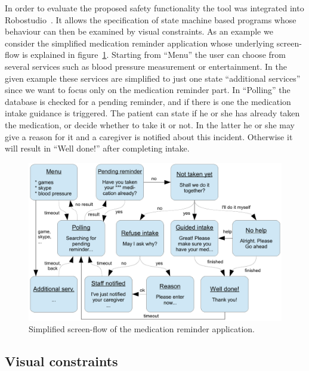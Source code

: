 \documentclass[conference]{IEEEtran}
\begin{document}
In order to evaluate the proposed safety functionality the tool was integrated into Robostudio~\cite{robostudio}. It allows the specification of state machine based programs whose behaviour can then be examined by visual constraints. As an example we consider the simplified medication reminder application whose underlying screen-flow is explained in figure~\ref{fig:medicationreminder}. Starting from ``Menu'' the user can choose from several services such as blood pressure measurement or entertainment. In the given example these services are simplified to just one state ``additional services'' since we want to focus only on the medication reminder part. In ``Polling'' the database is checked for a pending reminder, and if there is one the medication intake guidance is triggered. The patient can state if he or she has already taken the medication, or decide whether to take it or not. In the latter he or she may give a reason for it and a caregiver is notified about this incident. Otherwise it will result in ``Well done!'' after completing intake.

\begin{figure}[htbp]
  \centering
  \includegraphics[width=\linewidth]{stm} %
  \caption{Simplified screen-flow of the medication reminder application.
  }
  \label{fig:medicationreminder}
\end{figure}





\subsection{Visual constraints}
\end{document}
